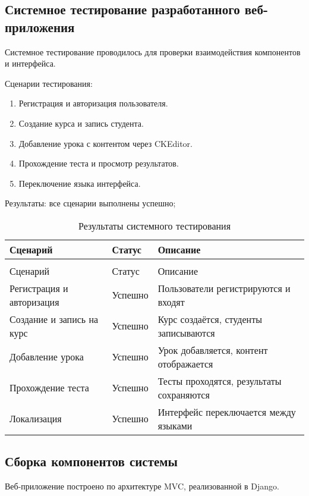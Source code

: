 \subsection{Системное тестирование разработанного веб-приложения}

Системное тестирование проводилось для проверки взаимодействия компонентов и интерфейса.

Сценарии тестирования:
	\begin{enumerate}
		\item Регистрация и авторизация пользователя.
		\item Создание курса и запись студента.
		\item Добавление урока с контентом через CKEditor.
		\item Прохождение теста и просмотр результатов.
		\item Переключение языка интерфейса.
	\end{enumerate}
Результаты: все сценарии выполнены успешно;


\begin{xltabular}{\textwidth}{|X|l|X|}
	\caption{Результаты системного тестирования\label{tab:system_testing_results}}\\
	\hline
	Сценарий & Статус & Описание \\ \hline
	\endfirsthead
	\\
	\hline
	Сценарий & Статус & Описание \\ \hline
	\endhead
	Регистрация и авторизация & Успешно & Пользователи регистрируются и входят \\ \hline
	Создание и запись на курс & Успешно & Курс создаётся, студенты записываются \\ \hline
	Добавление урока & Успешно & Урок добавляется, контент отображается \\ \hline
	Прохождение теста & Успешно & Тесты проходятся, результаты сохраняются \\ \hline
	Локализация & Успешно & Интерфейс переключается между языками \\ \hline
\end{xltabular}


\subsection{Сборка компонентов системы}

Веб-приложение построено по архитектуре MVC, реализованной в Django.

